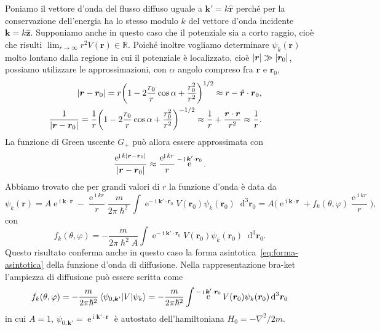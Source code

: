 \documentclass[a4paper,fleqn,twoside,12pt]{article}
\renewcommand{\phi}{\varphi}
\newcommand*{\dd}{\mathop{}\!\mathrm{d}} %
\DeclareMathOperator{\e}{\mathrm{e}} %
\DeclareMathOperator{\uimm}{\mathrm{i}} %
\DeclarePairedDelimiter{\abs}{\lvert}{\rvert}
\newcommand*{\versor}[1]{\hat{\bm{#1}}}
\begin{document}
Poniamo il vettore d'onda del flusso diffuso uguale a $\bm{k}' = k\versor{r}$
perché per la conservazione dell'energia ha lo stesso modulo $k$ del vettore
d'onda incidente $\bm{k} = k\versor{z}$.  Supponiamo anche in questo caso che il
potenziale sia a corto raggio, cioè che risulti
$\lim_{r \to \infty} r^{2}V(\bm{r}) \in \mathbb{R}$.  Poiché inoltre vogliamo
determinare $\psi_{k}(\bm{r})$ molto lontano dalla regione in cui il potenziale
è localizzato, cioè $\abs{\bm{r}} \gg \abs{\bm{r}_{0}}$, possiamo utilizzare le
approssimazioni, con $\alpha$ angolo compreso fra $\bm{r}$ e $\bm{r}_{0}$,
\begin{subequations}
  \begin{align}
    \begin{split}
      \abs{\bm{r} - \bm{r}_{0}} &=
      r\bigg(1-2\frac{r_{0}}{r}\cos\alpha+\frac{r_{0}^{2}}{r^{2}}\bigg)^{1/2}
      \approx r - \versor{r}\cdot\bm{r}_{0},
    \end{split} \\
    \begin{split}
      \frac{1}{\abs{\bm{r} - \bm{r}_{0}}} &= \frac{1}{r}\bigg(1 -
      2\frac{r_{0}}{r}\cos\alpha + \frac{r_{0}^{2}}{r^{2}}\bigg)^{-1/2} \approx
      \frac{1}{r} + \frac{\bm{r}\cdot\bm{r}_{}}{r^{2}} \approx \frac{1}{r}.
    \end{split}
  \end{align}
\end{subequations}
La funzione di Green uscente $G_{+}$ può allora essere approssimata con
\begin{equation}
  \frac{\e^{\uimm k\abs{\bm{r} - \bm{r}_{0}}}}{\abs{\bm{r} - \bm{r}_{0}}}
  \approx \frac{\e^{\uimm kr}}{r} \e^{-\uimm \bm{k}'\cdot\bm{r}_{0}}.
\end{equation}
Abbiamo trovato che per grandi valori di $r$ la funzione d'onda è data da
\begin{equation}
  \label{eq:bar}
  \psi_{k}(\bm{r}) = A\e^{\uimm \bm{k}\cdot\bm{r}} - \frac{\e^{\uimm kr}}{r}
  \frac{m}{2\pi\hslash^{2}} \int \e^{-\uimm \bm{k}'\cdot\bm{r}_{0}}
  V(\bm{r}_{0}) \psi_{k}(\bm{r}_{0}) \dd^{3}\bm{r}_{0} = A\bigg(\e^{\uimm
    \bm{k}\cdot\bm{r}} + f_{k}(\theta,\phi)\frac{\e^{\uimm kr}}{r}\bigg),
\end{equation}
con
\begin{equation}
  f_{k}(\theta,\phi) = -\frac{m}{2\pi\hslash^{2}A} \int\e^{-\uimm
    \bm{k}'\cdot\bm{r}_{0}} V(\bm{r}_{0}) \psi_{k}(\bm{r}_{0})\dd^{3}\bm{r}_{0}.
\end{equation}
Questo risultato conferma anche in questo caso la forma
asintotica~\eqref{eq:forma-asintotica} della funzione d'onda di diffusione.
Nella rappresentazione bra-ket l'ampiezza di diffusione può essere scritta come
\begin{equation}
  \label{eq:ampiezza-braket}
  f_{k}(\theta,\phi) = -\frac{m}{2\pi\hslash^{2}} \braket{\psi_{0,\bm{k}'} | V |
    \psi_{k}} = -\frac{m}{2\pi\hslash^{2}} \int\e^{-\uimm
    \bm{k}'\cdot\bm{r}_{0}} V(\bm{r}_{0}) \psi_{k}(\bm{r}_{0}) \dd^{3}\bm{r}_{0}
\end{equation}
in cui $A=1$, $\psi_{0,\bm{k'}} = \e^{\uimm \bm{k}'\cdot\bm{r}}$ è autostato
dell'hamiltoniana $H_{0} = -\nabla^{2}/2m$.
\end{document}
